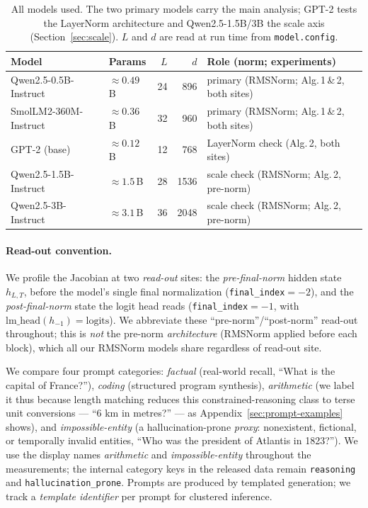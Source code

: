 \documentclass{article}
\begin{document}
\begin{table}[t]\centering\small
\begin{tabular}{llrrl}
\toprule
Model & Params & $L$ & $d$ & Role (norm; experiments) \\
\midrule
Qwen2.5-0.5B-Instruct & $\approx0.49$\,B & 24 & 896 & primary (RMSNorm; Alg.\,1\,\&\,2, both sites) \\
SmolLM2-360M-Instruct & $\approx0.36$\,B & 32 & 960 & primary (RMSNorm; Alg.\,1\,\&\,2, both sites) \\
GPT-2 (base) & $\approx0.12$\,B & 12 & 768 & LayerNorm check (Alg.\,2, both sites) \\
Qwen2.5-1.5B-Instruct & $\approx1.5$\,B & 28 & 1536 & scale check (RMSNorm; Alg.\,2, pre-norm) \\
Qwen2.5-3B-Instruct & $\approx3.1$\,B & 36 & 2048 & scale check (RMSNorm; Alg.\,2, pre-norm) \\
\bottomrule
\end{tabular}
\caption{All models used. The two primary models carry the main analysis; GPT-2 tests the LayerNorm
architecture and Qwen2.5-1.5B/3B the scale axis (Section~\ref{sec:scale}). $L$ and $d$ are read at run
time from \texttt{model.config}.}
\label{tab:models}
\end{table}

\paragraph{Read-out convention.} We profile the Jacobian at two \emph{read-out} sites: the
\emph{pre-final-norm} hidden state $h_{L,T}$, before the model's single final normalization
(\texttt{final\_index}$=-2$), and the \emph{post-final-norm} state the logit head reads
(\texttt{final\_index}$=-1$, with $\mathrm{lm\_head}(h_{-1})=\text{logits}$). We abbreviate these
``pre-norm''/``post-norm'' read-out throughout; this is \emph{not} the pre-norm \emph{architecture}
(RMSNorm applied before each block), which all our RMSNorm models share regardless of read-out site.

We compare four prompt categories: \emph{factual} (real-world recall, ``What is the capital of
France?''), \emph{coding} (structured program synthesis), \emph{arithmetic} (we label it thus because
length matching reduces this constrained-reasoning class to terse unit conversions --- ``6 km in
metres?'' --- as Appendix~\ref{sec:prompt-examples} shows), and \emph{impossible-entity} (a
hallucination-prone \emph{proxy}: nonexistent, fictional, or temporally invalid entities, ``Who was the
president of Atlantis in 1823?''). We use the display names \emph{arithmetic} and
\emph{impossible-entity} throughout the measurements; the internal category keys in the released data
remain \texttt{reasoning} and \texttt{hallucination\_prone}. Prompts are
produced by templated generation; we track a \emph{template identifier} per prompt for clustered
inference.
\end{document}
